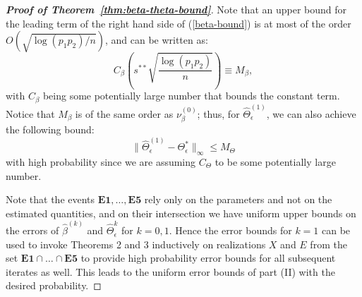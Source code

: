 \begin{proof}[\textbf{Proof of Theorem~\ref{thm:beta-theta-bound}}]
Note that an upper bound for the leading term of the right hand side of (\ref{beta-bound}) is at most of the order $O(\sqrt{\log(p_1p_2)/n})$, and can be written as:
\begin{equation*}
C_\beta\left( s^{**}\sqrt{\frac{\log(p_1p_2)}{n}}\right)\equiv M_\beta,
\end{equation*}
with $C_\beta$ being some potentially large number that bounds the constant term. Notice that $M_\beta$ is of the same order as $\nu_\beta^{(0)}$;
thus, for $\widehat{\Theta}^{(1)}_\epsilon$, we can also achieve the following bound: 
\begin{equation*}
\|\widehat{\Theta}_\epsilon^{(1)}-\Theta^*_\epsilon\|_\infty\leq M_\Theta
\end{equation*}
with high probability since we are assuming $C_\Theta$ to be some potentially large number. 

Note that the events $\textbf{E1}, \ldots, \textbf{E5}$ rely only on the parameters and not on the estimated quantities, and on their intersection we have uniform upper bounds on the errors of $\widehat{\beta}^{(k)}$ and $\widehat{\Theta}^{k}_{\epsilon}$ for $k = 0, 1$. Hence the error bounds for $k=1$ can be used to invoke Theorems 2 and 3 inductively on realizations $X$ and $E$ from the set $\textbf{E1} \cap \ldots \cap \textbf{E5}$ to provide high probability error bounds for all subsequent iterates as well. This leads to the uniform error bounds of part (II) with the desired probability.

\end{proof}
